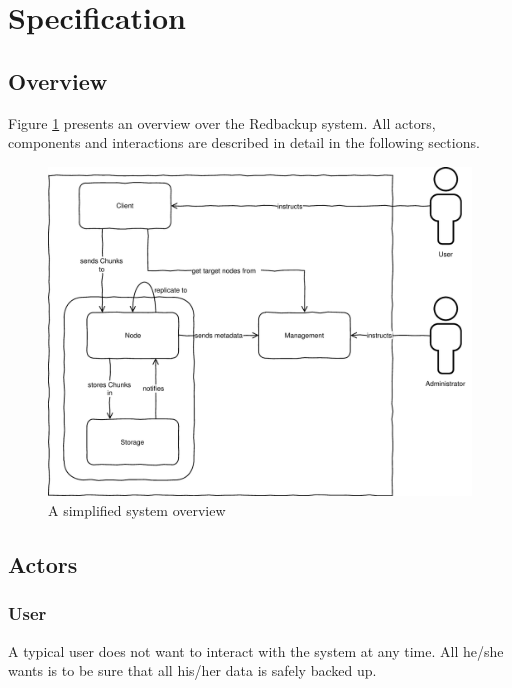
\section{Specification}\label{sec:specification}

\subsection{Overview}
Figure \ref{fig:architecture-overview} presents an overview over the Redbackup \gls{system}. All actors, components and interactions are described in detail in the following sections.

\begin{figure}[h]
    \centering
    \includegraphics[width=1\linewidth]{resources/architecture_overview}
    \caption{A simplified \gls{system} overview}
    \label{fig:architecture-overview}
\end{figure}

\subsection{Actors}

\subsubsection{User}
A typical \gls{user} does not want to interact with the \gls{system} at any time. All he/she wants is to be sure that all his/her data is safely backed up.

